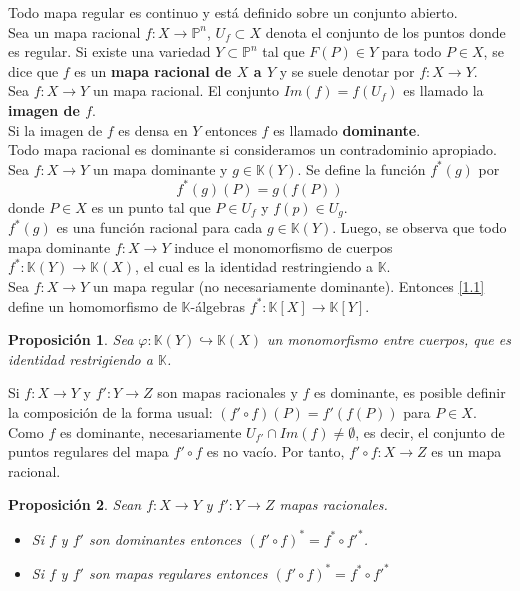 \documentclass[12pt,a4paper]{report}
\newcommand{\ep}{\mathbb{P}^{n}}
\newcommand{\K}{\mathbb{K}}
\newtheorem{prop}{Proposición}[chapter]
\begin{document}
Todo mapa regular  es continuo y está definido sobre un conjunto abierto.  \\
Sea un mapa racional $f:X \rightarrow \ep$, $U_{f} \subset X$ denota el conjunto de los puntos donde es regular. Si existe una variedad $Y\subset \ep$ tal que $F(P)\in Y $ para todo $P \in X$, se dice que $f$ es un \textbf{mapa racional de $X$ a $Y$} y se suele denotar por $f:X \rightarrow Y $.\\

Sea $f: X \rightarrow Y$ un mapa racional. El conjunto $Im(f)=f(U_{f})$ es llamado la \textbf{imagen de $f$}. \\
Si la imagen de $f$ es densa en $Y$ entonces $f$ es llamado \textbf{dominante}. \\
Todo mapa racional es dominante si consideramos un contradominio apropiado.\\

Sea $f:X  \rightarrow Y$ un mapa dominante y $g \in \K(Y)$. Se define la función $f^{*}(g)$ por 
\begin{equation}\label{1.1}
f^{*}(g)(P) = g(f(P)) 
\end{equation}
donde $P \in X$ es un punto tal que $P \in U_{f}$ y $f(p) \in U_{g}$.\\
$f^{*}(g)$ es una función racional para cada $g \in \K(Y)$. Luego, se observa que todo mapa dominante $f:X \rightarrow Y$ induce el monomorfismo de cuerpos $f^{*}:\K(Y) \rightarrow \K(X)$, el cual es la identidad restringiendo a $\K$.\\
Sea $f: X \rightarrow Y$ un mapa regular (no necesariamente dominante). Entonces \ref{1.1} define un homomorfismo de $\K$-álgebras $f^{*}:\K[X]\rightarrow \K[Y]$. \\

\begin{prop} \label{prop2}
	Sea $\varphi: \K (Y) \hookrightarrow \K (X)$ un monomorfismo entre cuerpos, que es identidad restrigiendo a $\K$. 
\end{prop}

Si $f:X \rightarrow Y$ y $f': Y \rightarrow Z$ son mapas racionales y $f$ es dominante, es posible definir la composición de la forma usual: $(f'\circ f)(P)= f'(f(P))$ para $P \in X$. Como $f$ es dominante, necesariamente $ U_{f'} \cap Im(f) \neq \emptyset $, es decir, el conjunto de puntos regulares del mapa $f' \circ f$ es no vacío. Por tanto, $f' \circ f :X \rightarrow Z $ es un mapa racional.\\

\begin{prop} \label{prop3}
	Sean $f:X \rightarrow Y$ y $f': Y \rightarrow Z$ mapas racionales.
	\begin{itemize}
		\item Si $f$ y $f'$ son dominantes entonces $ (f' \circ f)^{*} = f^{*} \circ f'^{*} $.
		\item Si $f$ y $f'$ son mapas regulares entonces $(f' \circ f)^{*}=f^{*}\circ f'^{*}$
	\end{itemize}
\end{prop}
\end{document}
